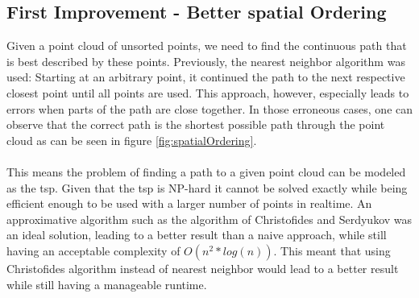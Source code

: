 \subsection{First Improvement - Better spatial Ordering}
Given a point cloud of unsorted points, we need to find the continuous path that is best described by these points. Previously, the nearest neighbor algorithm was used: Starting at an arbitrary point, it continued the path to the next respective closest point until all points are used. This approach, however, especially leads to errors when parts of the path are close together. In those erroneous cases, one can observe that the correct path is the shortest possible path through the point cloud as can be seen in figure \ref{fig:spatialOrdering}.\\
\\
This means the problem of finding a path to a given point cloud can be modeled as the \ac{tsp}. Given that the \ac{tsp} is NP-hard\cite{Korte2008} it cannot be solved exactly while being efficient enough to be used with a larger number of points in realtime. An approximative algorithm such as the algorithm of Christofides and Serdyukov was an ideal solution, leading to a better result than a naive approach, while still having an acceptable complexity of $O(n^2 * log(n))$\cite{Christofides2022}. This meant that using Christofides algorithm instead of nearest neighbor would lead to a better result while still having a manageable runtime. 

